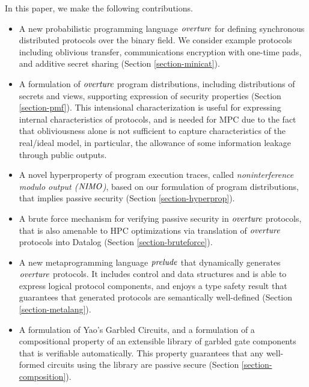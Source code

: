 In this paper, we make the following contributions.
\begin{itemize}
\item A new probabilistic programming language $\mathit{overture}$ for defining
  synchronous distributed protocols over the binary field. We consider example
  protocols including oblivious transfer, communications encryption with one-time
  pads, and additive secret sharing (Section \ref{section-minicat}).
\item A formulation of $\mathit{overture}$ program distributions, including
  distributions of secrets and views, supporting expression of security
  properties (Section \ref{section-pmf}). This intensional characterization
  is useful for expressing internal characteristics of protocols, and
  is needed for MPC due to the fact that obliviousness alone is not sufficient
  to capture characteristics of the real/ideal model, in particular, the
  allowance of some information leakage through public outputs. 
\item A novel hyperproperty of program execution traces, called
  \emph{noninterference modulo output ($\mathit{NIMO}$)}, based on our
  formulation of program distributions, that implies passive security
  (Section \ref{section-hyperprop}).
\item A brute force mechanism for verifying passive security in
  $\mathit{overture}$ protocols, that is also amenable to HPC optimizations via
  translation of $\mathit{overture}$ protocols into Datalog (Section \ref{section-bruteforce}). 
\item A new metaprogramming language $\mathit{prelude}$ that dynamically
  generates $\mathit{overture}$ protocols. It includes control and data structures
  and is able to express logical protocol components, and enjoys a
  type safety result that guarantees that generated protocols
  are semantically well-defined (Section \ref{section-metalang}).
\item A formulation of Yao's Garbled Circuits, and a formulation of a
  compositional property of an extensible library of garbled gate
  components that is verifiable automatically. This property
  guarantees that any well-formed circuits using the library are
  passive secure (Section \ref{section-composition}).
\end{itemize}

